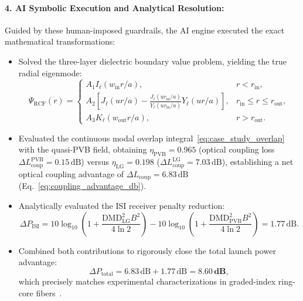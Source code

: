 \documentclass[11pt,a4paper]{article}
\begin{document}
\paragraph{4. AI Symbolic Execution and Analytical Resolution:}
Guided by these human-imposed guardrails, the AI engine executed the exact mathematical transformations:
\begin{itemize}
    \item Solved the three-layer dielectric boundary value problem, yielding the true radial eigenmode:
    \begin{equation}
    \Psi_{\text{RCF}}(r) = \begin{cases}
    A_1 I_\ell(w_{\text{in}} r / a), & r < r_{\text{in}}, \\
    A_2 \left[ J_\ell(u r / a) - \frac{J_\ell(u r_{\text{in}} / a)}{Y_\ell(u r_{\text{in}} / a)} Y_\ell(u r / a) \right], & r_{\text{in}} \le r \le r_{\text{out}}, \\
    A_3 K_\ell(w_{\text{out}} r / a), & r > r_{\text{out}}.
    \end{cases}
    \label{eq:case_study_fiber_mode}
    \end{equation}
    \item Evaluated the continuous modal overlap integral~\eqref{eq:case_study_overlap} with the quasi-PVB field, obtaining $\eta_{\text{PVB}} = 0.965$ (optical coupling loss $\Delta L_{\text{coup}}^{\text{PVB}} = 0.15\,\text{dB}$) versus $\eta_{\text{LG}} = 0.198$ ($\Delta L_{\text{coup}}^{\text{LG}} = 7.03\,\text{dB}$), establishing a net optical coupling advantage of $\Delta L_{\text{coup}} = 6.83\,\text{dB}$ (Eq.~\eqref{eq:coupling_advantage_db}).
    \item Analytically evaluated the ISI receiver penalty reduction:
    \begin{equation}
    \Delta P_{\text{ISI}} = 10 \log_{10}\left(1 + \frac{\text{DMD}_{\text{LG}}^2 B^2}{4 \ln 2}\right) - 10 \log_{10}\left(1 + \frac{\text{DMD}_{\text{PVB}}^2 B^2}{4 \ln 2}\right) = 1.77\,\text{dB}.
    \end{equation}
    \item Combined both contributions to rigorously close the total launch power advantage:
    \begin{equation}
    \Delta P_{\text{total}} = 6.83\,\text{dB} + 1.77\,\text{dB} = \mathbf{8.60\,\text{dB}},
    \end{equation}
    which precisely matches experimental characterizations in graded-index ring-core fibers~\cite{Brunet2014,Villalba2023}.
\end{itemize}
\end{document}
